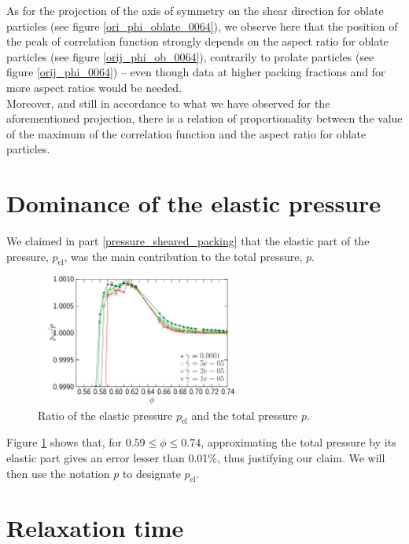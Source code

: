\documentclass[class=report, float=false, crop=false]{standalone}
\begin{document}
As for the projection of the axis of symmetry on the shear direction for oblate particles (see figure \ref{ori_phi_oblate_0064}), we observe here that the position of the peak of correlation function strongly depends on the aspect ratio for oblate particles (see figure \ref{orij_phi_ob_0064}), contrarily to prolate particles (see figure \ref{orij_phi_0064}) -- even though data at higher packing fractions and for more aspect ratios would be needed.\\

Moreover, and still in accordance to what we have observed for the aforementioned projection, there is a relation of proportionality between the value of the maximum of the correlation function and the aspect ratio for oblate particles.

\section{Dominance of the elastic pressure}

We claimed in part \ref{pressure_sheared_packing} that the elastic part of the pressure, $p_{\text{el}}$, was the main contribution to the total pressure, $p$.

\begin{figure}[h!]
\centering
\includegraphics[width=0.6\textwidth]{figures/figs/pe_ptot-zoom-phi}
\caption{Ratio of the elastic pressure $p_{\text{el}}$ and the total pressure $p$.}
\label{pe_ptot-zoom-phi}
\end{figure}

Figure \ref{pe_ptot-zoom-phi} shows that, for $0.59\le\phi\le0.74$, approximating the total pressure by its elastic part gives an error lesser than 0.01\%, thus justifying our claim. We will then use the notation $p$ to designate $p_{\text{el}}$.

\section{Relaxation time}
\end{document}
